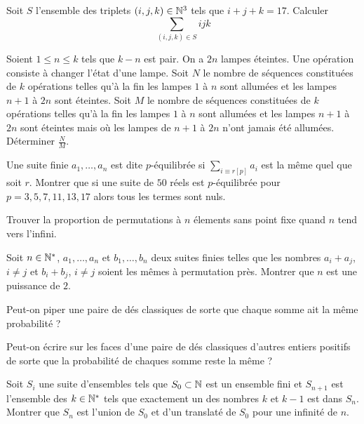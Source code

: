 \begin{exo}
Soit $S$ l'ensemble des triplets $(i,j,k)\in\mathbb N^3$ tels que $i+j+k=17$. Calculer $$\sum_{(i,j,k)\in S}ijk$$
\end{exo}


\begin{exo}
Soient $1 \le n \le k$ tels que $k-n$ est pair. On a $2n$ lampes éteintes. Une opération consiste à changer l'état d'une lampe. Soit $N$ le nombre de séquences constituées de $k$ opérations telles qu'à la fin les lampes $1$ à $n$ sont allumées et les lampes $n+1$ à $2n$ sont éteintes. Soit $M$ le nombre de séquences constituées de $k$ opérations telles qu'à la fin les lampes $1$ à $n$ sont allumées et les lampes $n+1$ à $2n$ sont éteintes mais où les lampes de $n+1$ à $2n$ n'ont jamais été allumées. Déterminer $\frac{N}{M}$.
\end{exo}


\begin{exo}
Une suite finie $a_1, \dots, a_n$ est dite $p$-équilibrée si $\sum_{i\equiv r[p]}a_i$ est la même quel que soit $r$. Montrer que si une suite de $50$ réels est $p$-équilibrée pour $p=3,5,7,11,13,17$ alors tous les termes sont nuls.
\end{exo}


\begin{exo}
Trouver la proportion de permutations à $n$ élements sans point fixe quand $n$ tend vers l'infini.
\end{exo}


\begin{exo}
Soit $n\in\mathbb N^*$, $a_1,\dots,a_n$ et $b_1,\dots,b_n$ deux suites finies telles que les nombres $a_i+a_j$, $i\ne j$ et $b_i+b_j$, $i\ne j$ soient les mêmes à permutation près. Montrer que $n$ est une puissance de $2$.
\end{exo}


\begin{exo}
Peut-on piper une paire de dés classiques de sorte que chaque somme ait la même probabilité ?
\end{exo}


\begin{exo}
Peut-on écrire sur les faces d'une paire de dés classiques d'autres entiers positifs de sorte que la probabilité de chaques somme reste la même ?
\end{exo}


\begin{exo}
Soit $S_i$ une suite d'ensembles tels que $S_0\subset\mathbb N$ est un ensemble fini et $S_{n+1}$ est l'ensemble des $k\in\mathbb N^*$ tels que exactement un des nombres $k$ et $k-1$ est dans $S_n$. Montrer que $S_n$ est l'union de $S_0$ et d'un translaté de $S_0$ pour une infinité de $n$.
\end{exo}


